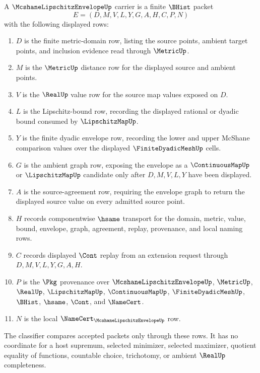 \begin{definition}
\label{def:mcshane-lipschitz-envelope-carrier}
A $\McshaneLipschitzEnvelopeUp$ carrier is a finite $\BHist$ packet
$$
E=(D,M,V,L,Y,G,A,H,C,P,N)
$$
with the following displayed rows:
\begin{enumerate}
\item $D$ is the finite metric-domain row, listing the source points, ambient target points, and inclusion evidence read through $\MetricUp$.
\item $M$ is the $\MetricUp$ distance row for the displayed source and ambient points.
\item $V$ is the $\RealUp$ value row for the source map values exposed on $D$.
\item $L$ is the Lipschitz-bound row, recording the displayed rational or dyadic bound consumed by $\LipschitzMapUp$.
\item $Y$ is the finite dyadic envelope row, recording the lower and upper McShane comparison values over the displayed $\FiniteDyadicMeshUp$ cells.
\item $G$ is the ambient graph row, exposing the envelope as a $\ContinuousMapUp$ or $\LipschitzMapUp$ candidate only after $D,M,V,L,Y$ have been displayed.
\item $A$ is the source-agreement row, requiring the envelope graph to return the displayed source value on every admitted source point.
\item $H$ records componentwise $\hsame$ transport for the domain, metric, value, bound, envelope, graph, agreement, replay, provenance, and local naming rows.
\item $C$ records displayed $\Cont$ replay from an extension request through $D,M,V,L,Y,G,A,H$.
\item $P$ is the $\Pkg$ provenance over $\McshaneLipschitzEnvelopeUp$, $\MetricUp$, $\RealUp$, $\LipschitzMapUp$, $\ContinuousMapUp$, $\FiniteDyadicMeshUp$, $\BHist$, $\hsame$, $\Cont$, and $\NameCert$.
\item $N$ is the local $\NameCert_{\McshaneLipschitzEnvelopeUp}$ row.
\end{enumerate}
The classifier compares accepted packets only through these rows. It has no coordinate for a host supremum, selected minimizer, selected maximizer, quotient equality of functions, countable choice, trichotomy, or ambient $\RealUp$ completeness.
\end{definition}

